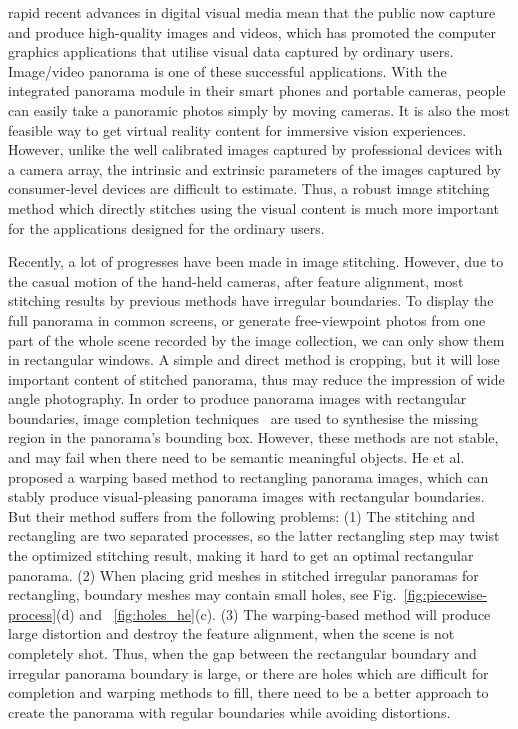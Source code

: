 \documentclass[10pt,journal,compsoc]{IEEEtran}
\begin{document}
 rapid recent advances in digital visual media mean that the public now capture and produce high-quality images and videos, which has promoted the computer graphics applications that utilise visual data captured by ordinary users. Image/video panorama  is one of these successful applications. With the integrated panorama module in their smart phones and portable cameras, people can easily take a panoramic photos simply by moving cameras. It is also the most feasible way to get virtual reality content for immersive vision experiences. However, unlike the well calibrated images captured by professional devices with a camera array, the intrinsic and extrinsic parameters of the images captured by consumer-level devices are difficult to estimate. Thus, a robust image stitching method which directly stitches using the visual content is much more important for the applications designed for the ordinary users.

Recently, a lot of progresses have been made in image stitching. However, due to the casual motion of the hand-held cameras, after feature alignment, most stitching results by previous methods have irregular boundaries. To display the full panorama in common screens, or generate free-viewpoint photos from one part of the whole scene recorded by the image collection, we can only show them in rectangular windows. A simple and direct method is cropping, but it will lose important content of stitched panorama, thus may reduce the impression of wide angle photography. In order to produce panorama images with rectangular boundaries, image completion techniques~\cite{journals/mta/YenYC17, journals/tog/BarnesSFG09} are used to synthesise the missing region in the panorama's bounding box. However, these methods are not stable, and may fail when there need to be semantic meaningful objects. He et al.~\cite{journals/tog/HeC013} proposed a warping based method to rectangling panorama images, which can stably produce visual-pleasing panorama images with rectangular boundaries. But their method suffers from the following problems:
(1) The stitching and rectangling are two separated processes, so the latter rectangling step may twist the optimized stitching result, making it hard to get an optimal rectangular panorama.
(2) When placing grid meshes in stitched irregular panoramas for rectangling, boundary meshes may contain small holes, see Fig.~\ref{fig:piecewise-process}(d) and ~\ref{fig:holes_he}(c).
(3) The warping-based method will produce large distortion and destroy the feature alignment, when the scene is not completely shot.
Thus, when the gap between the rectangular boundary and irregular panorama boundary is large, or there are holes which are difficult for completion and warping methods to fill, there need to be a better approach to create the panorama with regular boundaries while avoiding distortions.
\end{document}
